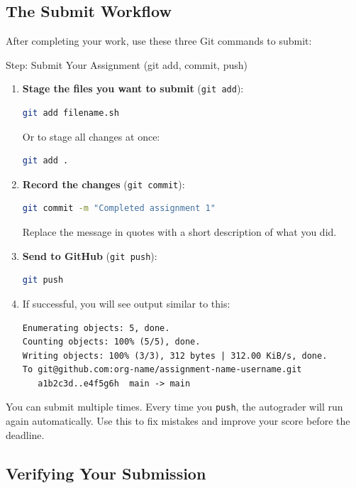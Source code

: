 \documentclass[
    a4paper,
    11pt,
    parskip=half
]{scrartcl}
\begin{document}
\subsection{The Submit Workflow}

After completing your work, use these three Git commands to submit:

\begin{stepbox}{Step: Submit Your Assignment (git add, commit, push)}
\begin{enumerate}
    \item \textbf{Stage the files you want to submit} (\texttt{git add}):
\begin{lstlisting}[language=bash]
git add filename.sh
\end{lstlisting}
    Or to stage all changes at once:
\begin{lstlisting}[language=bash]
git add .
\end{lstlisting}

    \item \textbf{Record the changes} (\texttt{git commit}):
\begin{lstlisting}[language=bash]
git commit -m "Completed assignment 1"
\end{lstlisting}
    Replace the message in quotes with a short description of what you did.

    \item \textbf{Send to GitHub} (\texttt{git push}):
\begin{lstlisting}[language=bash]
git push
\end{lstlisting}

    \item If successful, you will see output similar to this:
\begin{lstlisting}
Enumerating objects: 5, done.
Counting objects: 100% (5/5), done.
Writing objects: 100% (3/3), 312 bytes | 312.00 KiB/s, done.
To git@github.com:org-name/assignment-name-username.git
   a1b2c3d..e4f5g6h  main -> main
\end{lstlisting}
\end{enumerate}
\end{stepbox}

\begin{tipbox}
You can submit multiple times. Every time you \texttt{push}, the autograder will run again automatically. Use this to fix mistakes and improve your score before the deadline.
\end{tipbox}

\subsection{Verifying Your Submission}
\end{document}
